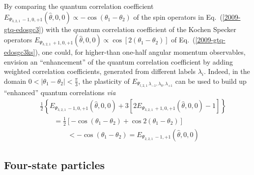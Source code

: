 \documentclass[fleqn,twoside]{article}      %
\begin{document}
By comparing the quantum correlation coefficient
$E_{{ \Psi_{3,2,1}}\,-1, 0, +1 } ({\hat \theta},0,0 )\propto - \cos (\theta_1 - \theta_2)$
of the spin operators in Eq.~(\ref{2009-gtq-edosgc3})
with the quantum correlation coefficient  of the Kochen Specker operators
$E_{{ \Psi_{3,2,1}}\,+1, 0, +1 } ({\hat \theta},0,0 ) \propto
\cos \left[2 ( \theta_1 - \theta_2 )\right]$
of Eq.~(\ref{2009-gtq-edosgc3ks}),
one could, for higher-than one-half angular momentum observables, envision an ``enhancement'' of the quantum correlation coefficient
by adding weighted correlation coefficients, generated from different labels $\lambda_i$.
Indeed, in the domain $0< | \theta_1 -\theta_2 | < \frac{\pi }{3}$,
the plasticity of
$E_{{ \Psi_{l,2,1}}\,\lambda_{-1},  \lambda_{0} , \lambda_{+1} }$
can be used to build up ``enhanced'' quantum correlations {\it via}
\begin{equation}
\begin{array}{rcl}
&&\frac{1}{2}\left\{
E_{{ \Psi_{3,2,1}}\,-1, 0, +1 } ({\hat \theta},0,0 )
+
3\left[2 E_{{ \Psi_{3,2,1}}\,+1, 0, +1 } ({\hat \theta},0,0 ) -1\right]\right\}
\\
&&\qquad =  \frac{1}{2}\left[-\cos (\theta_1 -\theta_2 ) + \cos 2 (\theta_1 -\theta_2 )
\right]
\\
&& \qquad \qquad
< -\cos (\theta_1 -\theta_2 ) =  E_{{ \Psi_{2,2,1}}\,-1, +1 } ({\hat \theta},0,0 )
\end{array}
\label{2009-gtq-eqcs3}
\end{equation}






\subsection{Four-state particles}
\end{document}
